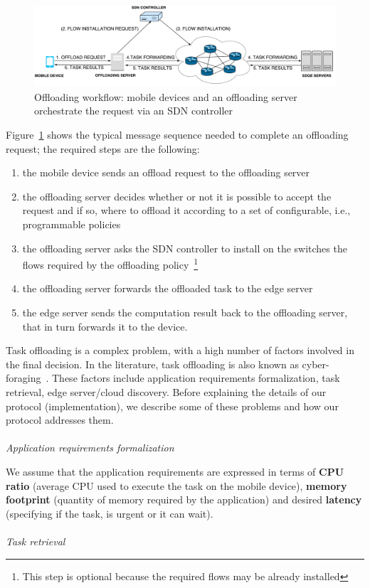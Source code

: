 \begin{figure}[]
\centering
\includegraphics[width=\textwidth]{img/protocol_sequence}   
\caption{Offloading workflow: mobile devices and an offloading server orchestrate the request via an SDN controller}
\label{fig:protocol}
\end{figure}

Figure~\ref{fig:protocol} shows the typical message sequence needed to complete an offloading request; the required steps are the following:
\begin{enumerate}
\item the mobile device sends an offload request to the offloading server
\item the offloading server decides whether or not it is possible to accept the request and if so, where to offload it according to a set of configurable, i.e., programmable policies
\item the offloading server asks the SDN controller to install on the switches the flows required by the offloading policy~\footnote{This step is optional  because the required flows may be already installed}
\item the offloading server forwards the offloaded task to the edge server 
\item the edge server sends the computation result back to the offloading server, that in turn forwards it to the device.
\end{enumerate}

Task offloading is a complex problem, with a high number of factors involved in the final decision. In the literature, task offloading is also known as cyber-foraging~\cite{cyberforagingsurvey}. These factors include application requirements formalization, task retrieval, edge server/cloud discovery. Before explaining the details of our protocol (implementation), we describe some of these problems and how our protocol addresses them.\\\\
\textit{Application requirements formalization}

We assume that the application requirements are expressed in terms of \textbf{CPU ratio} (average CPU used to execute the task on the mobile device), \textbf{memory footprint} (quantity of memory required by the application) and desired \textbf{latency} (specifying if the task, is urgent or it can wait).\\\\
\textit{Task retrieval}

